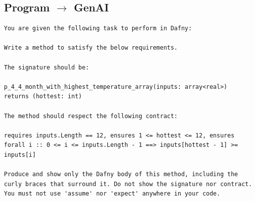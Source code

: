 \documentclass{article}
\begin{document}
\subsection*{Program $\rightarrow$ GenAI}
\begin{lstlisting}
You are given the following task to perform in Dafny:

Write a method to satisfy the below requirements.

The signature should be:

p_4_4_month_with_highest_temperature_array(inputs: array<real>) returns (hottest: int)

The method should respect the following contract:

requires inputs.Length == 12, ensures 1 <= hottest <= 12, ensures forall i :: 0 <= i <= inputs.Length - 1 ==> inputs[hottest - 1] >= inputs[i]

Produce and show only the Dafny body of this method, including the curly braces that surround it. Do not show the signature nor contract. You must not use 'assume' nor 'expect' anywhere in your code.
\end{lstlisting}
\end{document}
